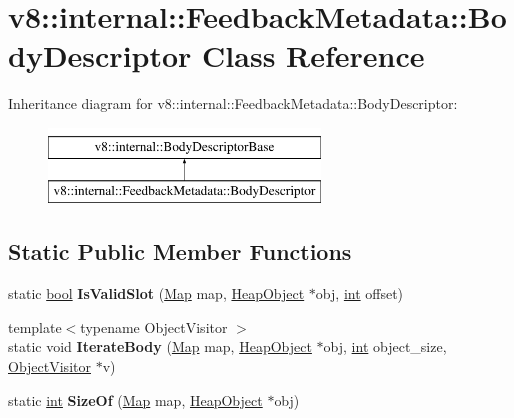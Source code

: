 \hypertarget{classv8_1_1internal_1_1FeedbackMetadata_1_1BodyDescriptor}{}\section{v8\+:\+:internal\+:\+:Feedback\+Metadata\+:\+:Body\+Descriptor Class Reference}
\label{classv8_1_1internal_1_1FeedbackMetadata_1_1BodyDescriptor}
Inheritance diagram for v8\+:\+:internal\+:\+:Feedback\+Metadata\+:\+:Body\+Descriptor\+:\begin{figure}[H]
\begin{center}
\leavevmode
\includegraphics[height=2.000000cm]{classv8_1_1internal_1_1FeedbackMetadata_1_1BodyDescriptor}
\end{center}
\end{figure}
\subsection*{Static Public Member Functions}
\begin{DoxyCompactItemize}
\item 
\mbox{\label{classv8_1_1internal_1_1FeedbackMetadata_1_1BodyDescriptor_a77b10e3f77e208688ea0b13e4b34c7b7}} 
static \mbox{\hyperlink{classbool}{bool}} {\bfseries Is\+Valid\+Slot} (\mbox{\hyperlink{classv8_1_1internal_1_1Map}{Map}} map, \mbox{\hyperlink{classv8_1_1internal_1_1HeapObject}{Heap\+Object}} $\ast$obj, \mbox{\hyperlink{classint}{int}} offset)
\item 
\mbox{\label{classv8_1_1internal_1_1FeedbackMetadata_1_1BodyDescriptor_a108845ff1cade60c10786d76e46df4fd}} 
{\footnotesize template$<$typename Object\+Visitor $>$ }\\static void {\bfseries Iterate\+Body} (\mbox{\hyperlink{classv8_1_1internal_1_1Map}{Map}} map, \mbox{\hyperlink{classv8_1_1internal_1_1HeapObject}{Heap\+Object}} $\ast$obj, \mbox{\hyperlink{classint}{int}} object\+\_\+size, \mbox{\hyperlink{classv8_1_1internal_1_1ObjectVisitor}{Object\+Visitor}} $\ast$v)
\item 
\mbox{\label{classv8_1_1internal_1_1FeedbackMetadata_1_1BodyDescriptor_a447565119c55983c011c91f33987d9b4}} 
static \mbox{\hyperlink{classint}{int}} {\bfseries Size\+Of} (\mbox{\hyperlink{classv8_1_1internal_1_1Map}{Map}} map, \mbox{\hyperlink{classv8_1_1internal_1_1HeapObject}{Heap\+Object}} $\ast$obj)
\end{DoxyCompactItemize}
